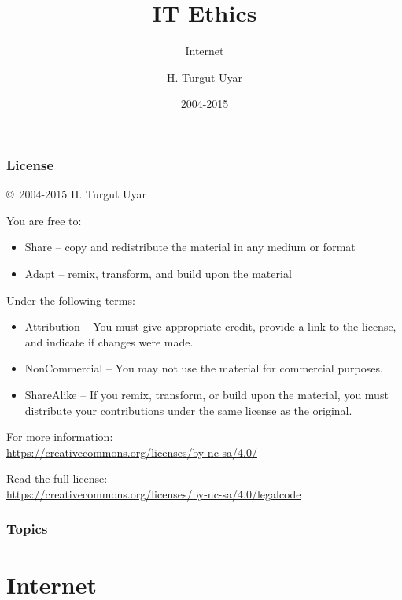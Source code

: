 \documentclass[dvipsnames]{beamer}
\title{IT Ethics}
\subtitle{Internet}
\author{H. Turgut Uyar}
\date{2004-2015}
\theoremstyle{plain}
\begin{document}
\begin{frame}
  \titlepage
\end{frame}

\begin{frame}
  \frametitle{License}

  \hfill
  \copyright~2004-2015 H. Turgut Uyar

  \vfill
  \begin{footnotesize}
    You are free to:
    \begin{itemize}
      \itemsep0em
      \item Share -- copy and redistribute the material in any medium or format
      \item Adapt -- remix, transform, and build upon the material
    \end{itemize}

    Under the following terms:
    \begin{itemize}
      \itemsep0em
      \item Attribution -- You must give appropriate credit, provide a link to
        the license, and indicate if changes were made.

      \item NonCommercial -- You may not use the material for commercial
        purposes.

      \item ShareAlike -- If you remix, transform, or build upon the material,
        you must distribute your contributions under the same license as the
        original.
    \end{itemize}
  \end{footnotesize}

  \begin{small}
    For more information:\\
    \url{https://creativecommons.org/licenses/by-nc-sa/4.0/}

    \smallskip
    Read the full license:\\
    \url{https://creativecommons.org/licenses/by-nc-sa/4.0/legalcode}
  \end{small}
\end{frame}

\begin{frame}
  \frametitle{Topics}
  \tableofcontents
\end{frame}

\section{Internet}
\end{document}
